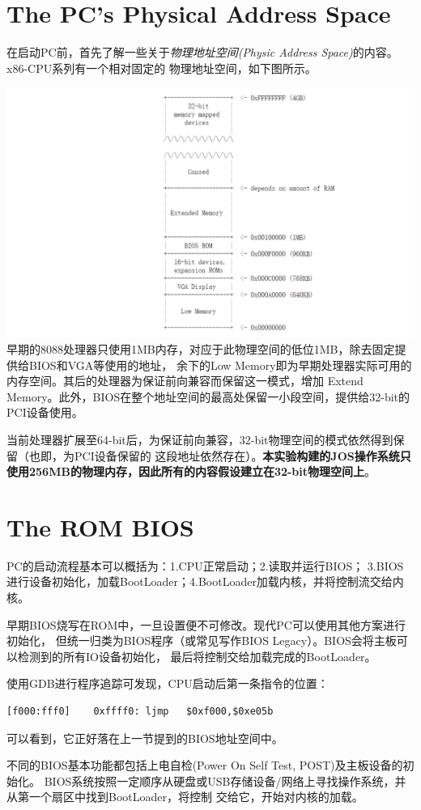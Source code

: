 \documentclass[12pt, letterpaper]{report}
\begin{document}
\section[\large The PC's Physical Address Space]{The PC's Physical Address Space}
在启动PC前，首先了解一些关于\textsl{物理地址空间(Physic Address Space)}的内容。x86-CPU系列有一个相对固定的
物理地址空间，如下图所示。\par

\includegraphics[width=\textwidth]{PC_PhysicalAddressSpace}
早期的8088处理器只使用1MB内存，对应于此物理空间的低位1MB，除去固定提供给BIOS和VGA等使用的地址，
余下的Low Memory即为早期处理器实际可用的内存空间。其后的处理器为保证前向兼容而保留这一模式，增加
Extend Memory。此外，BIOS在整个地址空间的最高处保留一小段空间，提供给32-bit的PCI设备使用。\par
当前处理器扩展至64-bit后，为保证前向兼容，32-bit物理空间的模式依然得到保留（也即，为PCI设备保留的
这段地址依然存在）。\textbf{本实验构建的JOS操作系统只使用256MB的物理内存，因此所有的内容假设建立在32-bit物理空间上}。\par

\section[\large The ROM BIOS]{The ROM BIOS}
PC的启动流程基本可以概括为：1.CPU正常启动；2.读取并运行BIOS；
3.BIOS进行设备初始化，加载BootLoader；4.BootLoader加载内核，并将控制流交给内核。\par 
早期BIOS烧写在ROM中，一旦设置便不可修改。现代PC可以使用其他方案进行初始化，
但统一归类为BIOS程序（或常见写作BIOS Legacy）。BIOS会将主板可以检测到的所有IO设备初始化，
最后将控制交给加载完成的BootLoader。\par
使用GDB进行程序追踪可发现，CPU启动后第一条指令的位置：
\lstset{style=AssemblyStyle}
\setmainfont{Consolas}
\begin{lstlisting}
[f000:fff0]    0xffff0: ljmp   $0xf000,$0xe05b
\end{lstlisting}
\setmainfont{Times New Roman}
可以看到，它正好落在上一节提到的BIOS地址空间中。\par 
不同的BIOS基本功能都包括上电自检(Power On Self Test, POST)及主板设备的初始化。
BIOS系统按照一定顺序从硬盘或USB存储设备/网络上寻找操作系统，并从第一个扇区中找到BootLoader，将控制
交给它，开始对内核的加载。\par 
\end{document}
